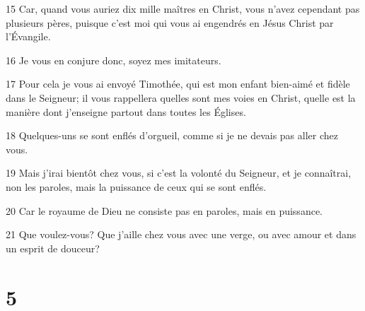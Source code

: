 \par 15 Car, quand vous auriez dix mille maîtres en Christ, vous n'avez cependant pas plusieurs pères, puisque c'est moi qui vous ai engendrés en Jésus Christ par l'Évangile.
\par 16 Je vous en conjure donc, soyez mes imitateurs.
\par 17 Pour cela je vous ai envoyé Timothée, qui est mon enfant bien-aimé et fidèle dans le Seigneur; il vous rappellera quelles sont mes voies en Christ, quelle est la manière dont j'enseigne partout dans toutes les Églises.
\par 18 Quelques-uns se sont enflés d'orgueil, comme si je ne devais pas aller chez vous.
\par 19 Mais j'irai bientôt chez vous, si c'est la volonté du Seigneur, et je connaîtrai, non les paroles, mais la puissance de ceux qui se sont enflés.
\par 20 Car le royaume de Dieu ne consiste pas en paroles, mais en puissance.
\par 21 Que voulez-vous? Que j'aille chez vous avec une verge, ou avec amour et dans un esprit de douceur?

\chapter{5}

